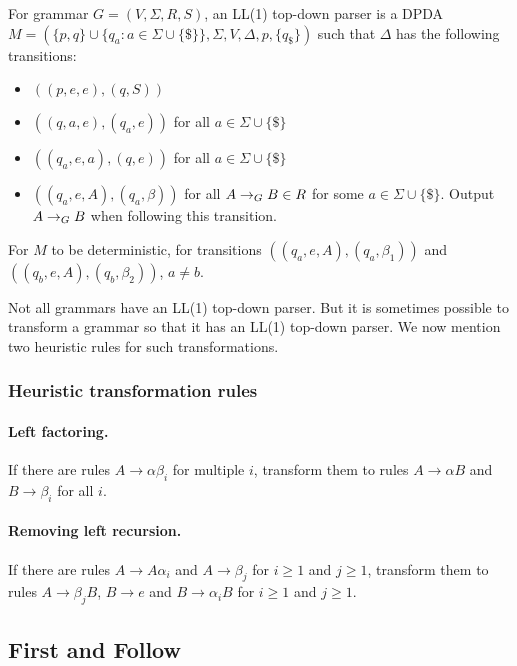 \begin{definition}
For grammar $G = (V, \Sigma, R, S)$, an LL(1) top-down parser is a DPDA
$M = (\{p, q\}\cup\{q_a: a \in \Sigma \cup \{\$\}\}, \Sigma, V, \Delta, p, \{q_{\$}\})$
such that $\Delta$ has the following transitions:
\begin{itemize}
\item $((p, e, e), (q, S))$
\item $((q, a, e), (q_a, e))$ for all $a \in \Sigma \cup \{\$\}$
\item $((q_a, e, a), (q, e))$ for all $a \in \Sigma \cup \{\$\}$
\item $((q_a, e, A), (q_a, \beta))$ for all $A \rightarrow_{G} B \in R$ for some $a \in \Sigma \cup \{\$\}$.
    Output $A \rightarrow_{G} B$ when following this transition.
\end{itemize}
For $M$ to be deterministic, for transitions $((q_a, e, A), (q_a, \beta_1))$
and $((q_b, e, A), (q_b, \beta_2))$, $a \neq b$.
\end{definition}

Not all grammars have an LL(1) top-down parser.
But it is sometimes possible to transform a grammar so that it has an LL(1) top-down parser.
We now mention two heuristic rules for such transformations.

\subsubsection{Heuristic transformation rules}

\paragraph{Left factoring.}
If there are rules $A \rightarrow \alpha\beta_i$ for multiple $i$,
transform them to rules $A \rightarrow \alpha B$ and $B \rightarrow \beta_i$ for all $i$.

\paragraph{Removing left recursion.}
If there are rules $A \rightarrow A\alpha_i$ and $A \rightarrow \beta_j$
for $i \ge 1$ and $j \ge 1$,
transform them to rules $A \rightarrow \beta_jB$, $B \rightarrow e$ and $B \rightarrow \alpha_iB$
for $i \ge 1$ and $j \ge 1$.

\subsection{First and Follow}

